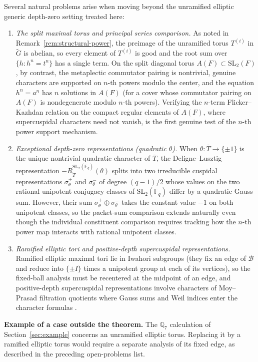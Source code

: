 \documentclass[12pt, letterpaper]{article}
\numberwithin{equation}{section}
\theoremstyle{definition}
\theoremstyle{remark}
\newcommand{\kk}{\mathbb{F}_q}
\newcommand{\Gbar}{\mathrm{SL}_2(\kk)}
\newcommand{\G}{\mathrm{SL}_2(F)}
\newcommand{\wtG}{\widetilde{G}}
\begin{document}
Several natural problems arise when moving beyond the unramified elliptic generic depth-zero setting treated here:
\begin{enumerate}[label=(\roman*)]
 \item \emph{The split maximal torus and principal series comparison.} As noted in Remark~\ref{rem:structural-power}, the preimage of the unramified torus $T^{(i)}$ in $\wtG$ is abelian, so every element of $T^{(i)}$ is good and the root sum over $\{h:h^n=t^n\}$ has a single term. On the split diagonal torus $A(F)\subset\G$, by contrast, the metaplectic commutator pairing is nontrivial, genuine characters are supported on $n$-th powers modulo the center, and the equation $h^n=a^n$ has $n$ solutions in $A(F)$ (for a cover whose commutator pairing on $A(F)$ is nondegenerate modulo $n$-th powers). Verifying the $n$-term Flicker--Kazhdan relation on the compact regular elements of $A(F)$, where supercuspidal characters need not vanish, is the first genuine test of the $n$-th power support mechanism.
 \item \emph{Exceptional depth-zero representations (quadratic $\theta$).} When $\theta:\bar{T}\to\{\pm 1\}$ is the unique nontrivial quadratic character of $\bar{T}$, the Deligne--Lusztig representation $-R_{\bar{T}}^{\Gbar}(\theta)$ splits into two irreducible cuspidal representations $\sigma_\theta^+$ and $\sigma_\theta^-$ of degree $(q-1)/2$ whose values on the two rational unipotent conjugacy classes of $\Gbar$ differ by a quadratic Gauss sum. However, their sum $\sigma_\theta^+\oplus\sigma_\theta^-$ takes the constant value $-1$ on both unipotent classes, so the packet-sum comparison extends naturally even though the individual constituent comparison requires tracking how the $n$-th power map interacts with rational unipotent classes.
 \item \emph{Ramified elliptic tori and positive-depth supercuspidal representations.} Ramified elliptic maximal tori lie in Iwahori subgroups (they fix an edge of $\mathscr{B}$ and reduce into $\{\pm I\}$ times a unipotent group at each of its vertices), so the fixed-ball analysis must be recentered at the midpoint of an edge, and positive-depth supercuspidal representations involve characters of Moy--Prasad filtration quotients where Gauss sums and Weil indices enter the character formulas \cite{SS68,DS18}.
\end{enumerate}

\noindent\textbf{Example of a case outside the theorem.} The $\mathbb{Q}_7$ calculation of Section~\ref{sec:example} concerns an unramified elliptic torus. Replacing it by a ramified elliptic torus would require a separate analysis of its fixed edge, as described in the preceding open-problems list.
\end{document}
